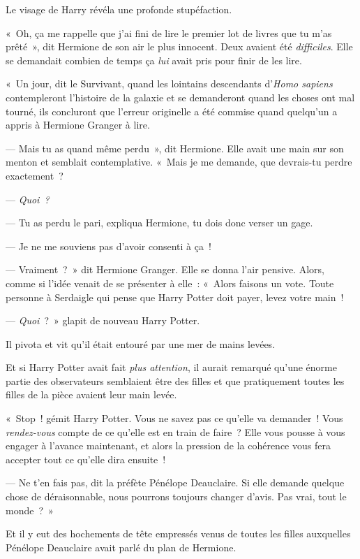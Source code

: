 Le visage de Harry révéla une profonde stupéfaction.

«~Oh, ça me rappelle que j'ai fini de lire le premier lot de livres que tu m'as prêté~», dit Hermione de son air le plus innocent. Deux avaient été \emph{difficiles}. Elle se demandait combien de temps ça \emph{lui} avait pris pour finir de les lire.

«~Un jour, dit le Survivant, quand les lointains descendants d'\emph{Homo sapiens} contempleront l'histoire de la galaxie et se demanderont quand les choses ont mal tourné, ils concluront que l'erreur originelle a été commise quand quelqu'un a appris à Hermione Granger à lire.

--- Mais tu as quand même perdu~», dit Hermione. Elle avait une main sur son menton et semblait contemplative. «~Mais je me demande, que devrais-tu perdre exactement~?

--- \emph{Quoi~?}

--- Tu as perdu le pari, expliqua Hermione, tu dois donc verser un gage.

--- Je ne me souviens pas d'avoir consenti à ça~!

--- Vraiment~?~» dit Hermione Granger. Elle se donna l'air pensive. Alors, comme si l'idée venait de se présenter à elle~: «~Alors faisons un vote. Toute personne à Serdaigle qui pense que Harry Potter doit payer, levez votre main~!

--- \emph{Quoi}~?~» glapit de nouveau Harry Potter.

Il pivota et vit qu'il était entouré par une mer de mains levées.

Et si Harry Potter avait fait \emph{plus attention}, il aurait remarqué qu'une énorme partie des observateurs semblaient être des filles et que pratiquement toutes les filles de la pièce avaient leur main levée.

«~Stop~! gémit Harry Potter. Vous ne savez pas ce qu'elle va demander~! Vous \emph{rendez-vous} compte de ce qu'elle est en train de faire~? Elle vous pousse à vous engager à l'avance maintenant, et alors la pression de la cohérence vous fera accepter tout ce qu'elle dira ensuite~!

--- Ne t'en fais pas, dit la préfète Pénélope Deauclaire. Si elle demande quelque chose de déraisonnable, nous pourrons toujours changer d'avis. Pas vrai, tout le monde~?~»

Et il y eut des hochements de tête empressés venus de toutes les filles auxquelles Pénélope Deauclaire avait parlé du plan de Hermione.

